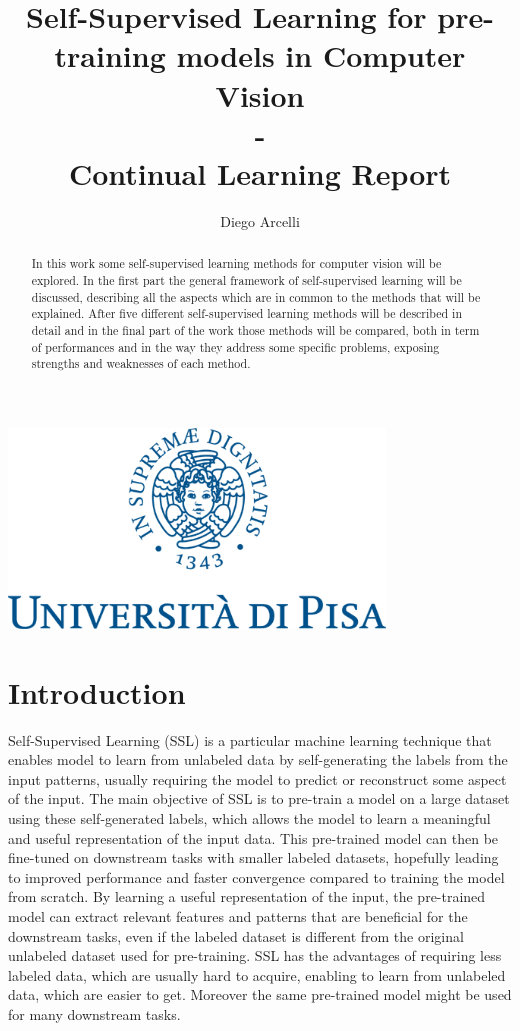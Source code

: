 \documentclass[12pt]{article}
\begin{document}
	
	\begin{titlepage}
		
		\title{Self-Supervised Learning for pre-training models in Computer Vision \\ - \\ Continual Learning Report}
		\author{Diego Arcelli}
		\maketitle
		\centering
		\includegraphics[width=10cm]{./images/unipi_logo.png}
		
	\end{titlepage}
	
	\tableofcontents
	\newpage
	
	\begin{abstract}
	\noindent In this work some self-supervised learning methods for computer vision will be explored. In the first part the general framework of self-supervised learning will be discussed, describing all the aspects which are in common to the methods that will be explained. After five different self-supervised learning methods will be described in detail and in the final part of the work those methods will be compared, both in term of performances and in the way they address some specific problems, exposing strengths and weaknesses of each method.
	\end{abstract}
	
	\section{Introduction}
	Self-Supervised Learning (SSL) is a particular machine learning technique that enables model to learn from unlabeled data by self-generating the labels from the input patterns, usually requiring the model to predict or reconstruct some aspect of the input. The main objective of SSL is to pre-train a model on a large dataset using these self-generated labels, which allows the model to learn a meaningful and useful representation of the input data. This pre-trained model can then be fine-tuned on downstream tasks with smaller labeled datasets, hopefully leading to improved performance and faster convergence compared to training the model from scratch. By learning a useful representation of the input, the pre-trained model can extract relevant features and patterns that are beneficial for the downstream tasks, even if the labeled dataset is different from the original unlabeled dataset used for pre-training. SSL has the advantages of requiring less labeled data, which are usually hard to acquire, enabling to learn from unlabeled data, which are easier to get. Moreover the same pre-trained model might be used for many downstream tasks. 
	
\end{document}
